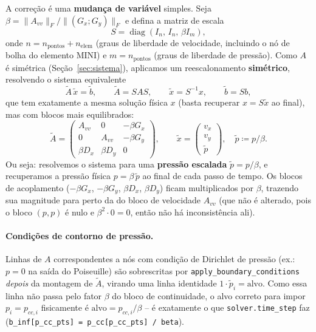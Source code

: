 \documentclass[11pt,a4paper]{article}
\newcommand{\vx}{v_x}
\newcommand{\vy}{v_y}
\begin{document}
A correção é uma \textbf{mudança de variável} simples. Seja $\beta =
\|A_{vv}\|_F / \|(G_x;G_y)\|_F$ e defina a matriz de escala
\begin{equation}
  S = \operatorname{diag}(I_n,\, I_n,\, \beta I_m),
\end{equation}
onde $n = n_{\text{pontos}}+n_{\text{elem}}$ (graus de liberdade de
velocidade, incluindo o nó de bolha do elemento MINI) e $m =
n_{\text{pontos}}$ (graus de liberdade de pressão). Como $A$ é
simétrica (Seção~\ref{sec:sistema}), aplicamos um reescalonamento
\textbf{simétrico}, resolvendo o sistema equivalente
\begin{equation}
  \tilde A\,\tilde x = \tilde b,
  \qquad
  \tilde A = S A S,
  \qquad
  \tilde x = S^{-1}x,
  \qquad
  \tilde b = S b,
\end{equation}
que tem exatamente a mesma solução física $x$ (basta recuperar $x = S
\tilde x$ ao final), mas com blocos mais equilibrados:
\begin{equation}
  \tilde A =
  \begin{pmatrix}
    A_{vv} & 0 & -\beta G_x \\
    0 & A_{vv} & -\beta G_y \\
    \beta D_x & \beta D_y & 0
  \end{pmatrix},
  \qquad
  \tilde x = \begin{pmatrix}\vx\\ \vy\\ \tilde p\end{pmatrix},
  \quad \tilde p \coloneqq p/\beta.
\end{equation}
Ou seja: resolvemos o sistema para uma \textbf{pressão escalada}
$\tilde p = p/\beta$, e recuperamos a pressão física $p = \beta\,
\tilde p$ ao final de cada passo de tempo. Os blocos de acoplamento
($-\beta G_x$, $-\beta G_y$, $\beta D_x$, $\beta D_y$) ficam multiplicados
por $\beta$, trazendo sua magnitude para perto da do bloco de
velocidade $A_{vv}$ (que não é alterado, pois o bloco $(p,p)$ é nulo e
$\beta^2\cdot 0 = 0$, então não há inconsistência ali).

\paragraph{Condições de contorno de pressão.} Linhas de $A$
correspondentes a nós com condição de Dirichlet de pressão (ex.:
$p=0$ na saída do Poiseuille) são sobrescritas por
\texttt{apply\_boundary\_conditions} \emph{depois} da montagem de
$\tilde A$, virando uma linha identidade $1\cdot \tilde p_i =
\text{alvo}$. Como essa linha não passa pelo fator $\beta$ do bloco de
continuidade, o alvo correto para impor $p_i = p_{cc,i}$ fisicamente é
$\text{alvo} = p_{cc,i}/\beta$ -- é exatamente o que
\texttt{solver.time\_step} faz (\texttt{b\_inf[p\_cc\_pts] =
p\_cc[p\_cc\_pts] / beta}).
\end{document}
